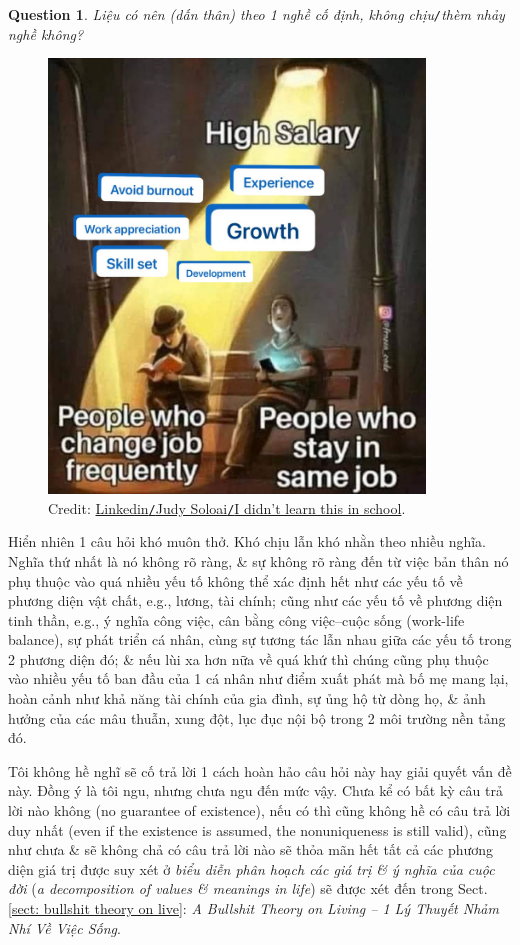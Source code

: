 \documentclass[12pt,twoside]{book}
\newtheorem{question}{Question}
\begin{document}
\begin{question}
	Liệu có nên (dấn thân) theo 1 nghề cố định, không chịu{\tt/}thèm nhảy nghề không? 
\end{question}

\begin{figure}[H]
	\centering
	\includegraphics[width = 10cm]{high_salary}
	\caption{Credit: \href{https://www.linkedin.com/posts/judy-soloai_i-didnt-learn-this-in-school-i-learned-activity-7089014937494179840-jTze/}{Linkedin{\tt/}Judy Soloai{\tt/}I didn't learn this in school}.}
\end{figure}
Hiển nhiên 1 câu hỏi khó muôn thở. Khó chịu lẫn khó nhằn theo nhiều nghĩa. Nghĩa thứ nhất là nó không rõ ràng, \& sự không rõ ràng đến từ việc bản thân nó phụ thuộc vào quá nhiều yếu tố không thể xác định hết như các yếu tố về phương diện vật chất, e.g., lương, tài chính; cũng như các yếu tố về phương diện tinh thần, e.g., ý nghĩa công việc, cân bằng công việc--cuộc sống (work-life balance), sự phát triển cá nhân, cùng sự tương tác lẫn nhau giữa các yếu tố trong 2 phương diện đó; \& nếu lùi xa hơn nữa về quá khứ thì chúng cũng phụ thuộc vào nhiều yếu tố ban đầu của 1 cá nhân như điểm xuất phát mà bố mẹ mang lại, hoàn cảnh như khả năng tài chính của gia đình, sự ủng hộ từ dòng họ, \& ảnh hưởng của các mâu thuẫn, xung đột, lục đục nội bộ trong 2 môi trường nền tảng đó.

Tôi không hề nghĩ sẽ cố trả lời 1 cách hoàn hảo câu hỏi này hay giải quyết vấn đề này. Đồng ý là tôi ngu, nhưng chưa ngu đến mức vậy. Chưa kể có bất kỳ câu trả lời nào không (no guarantee of existence), nếu có thì cũng không hề có câu trả lời duy nhất (even if the existence is assumed, the nonuniqueness is still valid), cũng như chưa \& sẽ không chả có câu trả lời nào sẽ thỏa mãn hết tất cả các phương diện giá trị được suy xét ở {\it biểu diễn phân hoạch các giá trị \& ý nghĩa của cuộc đời} ({\it a decomposition of values \& meanings in life}) sẽ được xét đến trong Sect. \ref{sect: bullshit theory on live}: {\it A Bullshit Theory on Living -- 1 Lý Thuyết Nhảm Nhí Về Việc Sống}.
\end{document}
